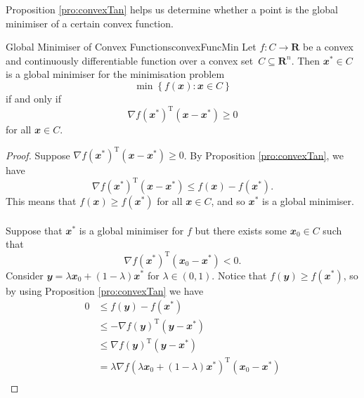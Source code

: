 \documentclass[math, code]{amznotes}
\theoremstyle{remark}
\begin{document}
Proposition \ref{pro:convexTan} helps us determine whether a point is the global minimiser of a certain convex function.
\begin{thmbox}{Global Minimiser of Convex Functions}{convexFuncMin}
    Let $f \colon C \to \mathbf{R}$ be a convex and continuously differentiable function over a convex set~$C \subseteq \mathbf{R}^n$. Then $\mathbfit{x}^* \in C$ is a global minimiser for the minimisation problem 
    \begin{displaymath}
        \min\left\{f(\mathbfit{x}) \colon \mathbfit{x} \in C\right\}
    \end{displaymath}
    if and only if
    \begin{equation*}
        \nabla f(\mathbfit{x}^*)^{\mathrm{T}}(\mathbfit{x} - \mathbfit{x}^*) \geq 0
    \end{equation*}
    for all $\mathbfit{x} \in C$.
    \tcblower   
    \begin{proof}
        Suppose $\nabla f(\mathbfit{x}^*)^{\mathrm{T}}(\mathbfit{x} - \mathbfit{x}^*) \geq 0$. By Proposition \ref{pro:convexTan}, we have 
        \begin{equation*}
            \nabla f(\mathbfit{x}^*)^{\mathrm{T}}(\mathbfit{x} - \mathbfit{x}^*) \leq f(\mathbfit{x}) - f(\mathbfit{x}^*).
        \end{equation*}
        This means that $f(\mathbfit{x}) \geq f(\mathbfit{x}^*)$ for all $\mathbfit{x} \in C$, and so $\mathbfit{x}^*$ is a global minimiser.
        \\\\
        Suppose that $\mathbfit{x}^*$ is a global minimiser for $f$ but there exists some $\mathbfit{x}_0 \in C$ such that
        \begin{equation*}
            \nabla f(\mathbfit{x}^*)^{\mathrm{T}}(\mathbfit{x}_0 - \mathbfit{x}^*) < 0.
        \end{equation*}
        Consider $\mathbfit{y} = \lambda\mathbfit{x}_0 + (1 - \lambda)\mathbfit{x}^*$ for $\lambda \in (0, 1)$. Notice that $f(\mathbfit{y}) \geq f(\mathbfit{x}^*)$, so by using Proposition \ref{pro:convexTan} we have
        \begin{align*}
            0 & \leq f(\mathbfit{y}) - f(\mathbfit{x}^*) \\
            & \leq -\nabla f(\mathbfit{y})^{\mathrm{T}}(\mathbfit{y - x^*}) \\
            & \leq \nabla f(\mathbfit{y})^{\mathrm{T}}(\mathbfit{y - x^*}) \\
            & = \lambda\nabla f\left(\lambda\mathbfit{x}_0 + (1 - \lambda)\mathbfit{x}^*\right)^{\mathrm{T}}(\mathbfit{x_0 - x^*}) \\

\end{align*}
\end{proof}
\end{thmbox}
\end{document}
